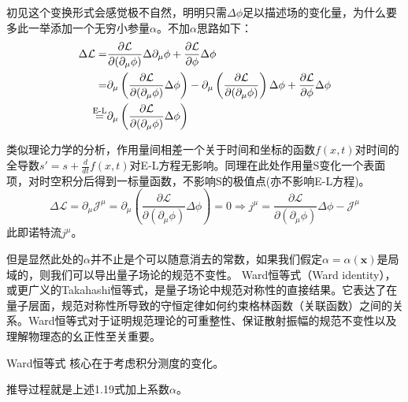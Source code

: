\documentclass[../main.tex]{subfiles}
\begin{document}
\begin{note}
    初见这个变换形式会感觉极不自然，明明只需$\Delta \phi$足以描述场的变化量，为什么要多此一举添加一个无穷小参量$\alpha$。不加$\alpha$思路如下：
    \begin{equation}
         \begin{aligned}
        \Delta \mathcal{L} = & \frac{\partial \mathcal{L}}{\partial (\partial_{\mu}\phi)}\Delta \partial_{\mu}\phi + \frac{\partial \mathcal{L}}{\partial\phi}\Delta\phi \notag \\
                           = & \partial_{\mu} \left( \frac{\partial \mathcal{L}}{\partial (\partial_{\mu}\phi)} \Delta\phi \right) - \partial_{\mu} \left( \frac{\partial \mathcal{L}}{\partial (\partial_{\mu}\phi)} \right)\Delta\phi + \frac{\partial \mathcal{L}}{\partial \phi}\Delta\phi \notag \\
        \overset{\text{E-L}}{=}  & \partial_{\mu} \left( \frac{\partial \mathcal{L}}{\partial (\partial_{\mu}\phi)} \Delta\phi \right)
        \end{aligned}
    \end{equation}
   
    类似理论力学的分析，作用量间相差一个关于时间和坐标的函数$f(x,t)$对时间的全导数$s' = s + \frac{d}{dt}f(x,t)$对E-L方程无影响。同理在此处作用量S变化一个表面项，对时空积分后得到一标量函数，不影响S的极值点(亦不影响E-L方程)。
    \begin{equation}
        \Delta \mathcal{L} = \partial_{\mu}\mathcal{J}^{\mu} = \partial_{\mu} \left( \frac{\partial \mathcal{L}}{\partial (\partial_{\mu}\phi)} \Delta\phi \right) = 0 \Rightarrow j^{\mu} = \frac{\partial \mathcal{L}}{\partial (\partial_{\mu}\phi)} \Delta\phi -\mathcal{J}^{\mu} 
        \label{eq:1.18}
    \end{equation}
    此即诺特流$j^{\mu}$。
    
    但是显然此处的$\alpha$并不止是个可以随意消去的常数，如果我们假定$\alpha= \alpha(\bm{x})$是局域的，则我们可以导出量子场论的规范不变性。
    Ward恒等式（Ward identity），或更广义的Takahashi恒等式，是量子场论中规范对称性的直接结果。它表达了在量子层面，规范对称性所导致的守恒定律如何约束格林函数（关联函数）之间的关系。Ward恒等式对于证明规范理论的可重整性、保证散射振幅的规范不变性以及理解物理态的幺正性至关重要。
    \begin{theorem}{Ward恒等式}
        核心在于考虑积分测度的变化。
    \end{theorem}

\end{note}
    推导过程就是上述1.19式加上系数$\alpha$。
\end{document}
